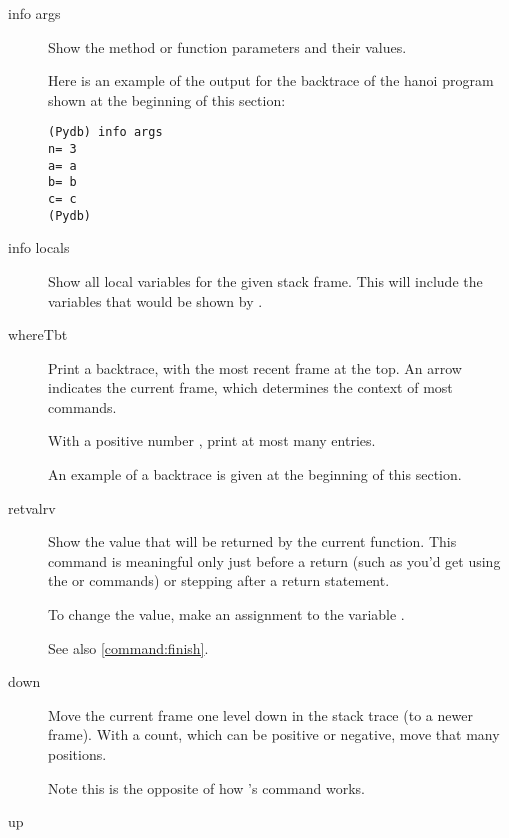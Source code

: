 \begin{description}

\item[info args]\label{command:info-args}

Show the method or function parameters and their values. 

Here is an example of the output for the backtrace of the hanoi
program shown at the beginning of this section:

\begin{verbatim}
(Pydb) info args
n= 3
a= a
b= b
c= c
(Pydb) 
\end{verbatim}

\item[info locals]\label{command:info-locals}

Show all local variables for the given stack frame. This will include
the variables that would be shown by .

\item[where\code{\Large{|}}T\code{\Large{|}}bt ]

Print a backtrace, with the most recent frame at the top.  An
arrow indicates the current frame, which determines the context of
most commands.

With a positive number , print at most many entries.

An example of a backtrace is given at the beginning of this section.

\item[retval\code{\Large{|}}rv]\label{command:retval}

Show the value that will be returned by the current function. This
command is meaningful only just before a return (such as you'd get
using the  or  commands) or stepping after a
return statement.

To change the value, make an assignment to the variable
.

See also \ref{command:finish}.

\item[down ]

Move the current frame one level down in the stack trace
(to a newer frame). With a count, which can be positive
or negative, move that many positions.

Note this is the opposite of how 's  command works.

\item[up ]


\end{description}
